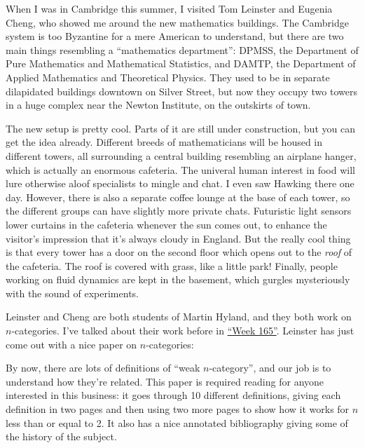 \documentclass{article}
\def\tightlist{}
\renewcommand{\texttt}[1]{%
  \begingroup
  \ttfamily
  \begingroup\lccode`~=`/\lowercase{\endgroup\def~}{/\discretionary{}{}{}}%
  \begingroup\lccode`~=`[\lowercase{\endgroup\def~}{[\discretionary{}{}{}}%
  \begingroup\lccode`~=`.\lowercase{\endgroup\def~}{.\discretionary{}{}{}}%
  \catcode`/=\active\catcode`[=\active\catcode`.=\active
  \scantokens{#1\noexpand}%
  \endgroup
}
\begin{document}
When I was in Cambridge this summer, I visited Tom Leinster and Eugenia
Cheng, who showed me around the new mathematics buildings. The Cambridge
system is too Byzantine for a mere American to understand, but there are
two main things resembling a ``mathematics department'': DPMSS, the
Department of Pure Mathematics and Mathematical Statistics, and DAMTP,
the Department of Applied Mathematics and Theoretical Physics. They used
to be in separate dilapidated buildings downtown on Silver Street, but
now they occupy two towers in a huge complex near the Newton Institute,
on the outskirts of town.

The new setup is pretty cool. Parts of it are still under construction,
but you can get the idea already. Different breeds of mathematicians
will be housed in different towers, all surrounding a central building
resembling an airplane hanger, which is actually an enormous cafeteria.
The univeral human interest in food will lure otherwise aloof
specialists to mingle and chat. I even saw Hawking there one day.
However, there is also a separate coffee lounge at the base of each
tower, so the different groups can have slightly more private chats.
Futuristic light sensors lower curtains in the cafeteria whenever the
sun comes out, to enhance the visitor's impression that it's always
cloudy in England. But the really cool thing is that every tower has a
door on the second floor which opens out to the \emph{roof} of the
cafeteria. The roof is covered with grass, like a little park! Finally,
people working on fluid dynamics are kept in the basement, which gurgles
mysteriously with the sound of experiments.

Leinster and Cheng are both students of Martin Hyland, and they both
work on \(n\)-categories. I've talked about their work before in
\protect\hyperlink{week165}{``Week 165''}. Leinster has just come out
with a nice paper on \(n\)-categories:


By now, there are lots of definitions of ``weak \(n\)-category'', and
our job is to understand how they're related. This paper is required
reading for anyone interested in this business: it goes through 10
different definitions, giving each definition in two pages and then
using two more pages to show how it works for \(n\) less than or equal
to 2. It also has a nice annotated bibliography giving some of the
history of the subject.
\end{document}
